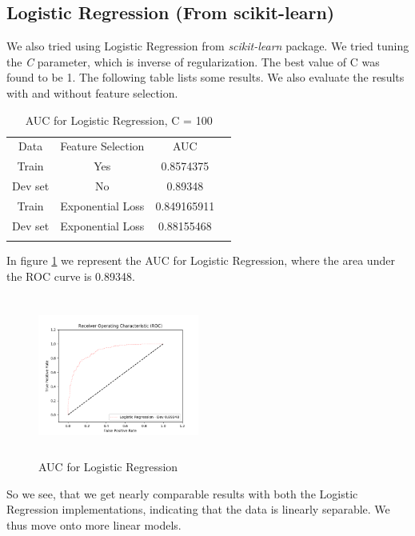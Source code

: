 \documentclass[conference]{IEEEtran}
\numberwithin{equation}{section}
\numberwithin{figure}{section}
\numberwithin{table}{section}
\begin{document}
\subsection{Logistic Regression (From scikit-learn)}
We also tried using Logistic Regression from \textit{scikit-learn} package. We tried tuning the \textit{C} parameter, which is inverse of 	regularization. The best value of C was found to be 1. The following table lists some results. We also evaluate the results with and without feature selection. 

\begin{table}[!htb]
 \centering
 \caption{AUC for Logistic Regression, C = 100}
 \label{tab_lr}
\begin{tabular}{ c c c c } 
	    \noalign{\smallskip}\hline\noalign{\smallskip}
		Data &  Feature Selection & AUC \\
    	   \noalign{\smallskip}\hline\noalign{\smallskip}
		Train &  Yes & 0.8574375\\
		Dev set & No & 0.89348\\
		\noalign{\smallskip}\hline\noalign{\smallskip}
		Train &  Exponential Loss & 0.849165911\\
		Dev set & Exponential Loss & 0.88155468\\
		\noalign{\smallskip}\hline\noalign{\smallskip}	
  \end{tabular} 
\end{table}

In figure \ref{lr_fig} we represent the AUC for Logistic Regression, where the area under the ROC curve is 0.89348.

\begin{figure}
\centering
  \includegraphics[width=200px, height = 200px]{lr_}
  \caption{AUC for Logistic Regression}
  \label{lr_fig}
\end{figure}

So we see, that we get nearly comparable results with both the Logistic Regression implementations, indicating that the data is linearly separable. We thus move onto more linear models.
\end{document}
